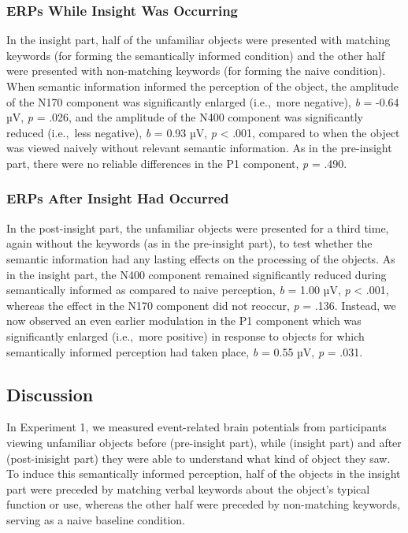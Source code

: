 \documentclass[
  english,
  man,12pt,twoside]{apa7}
\begin{document}
\hypertarget{erps-while-insight-was-occurring}{%
\subsubsection{ERPs While Insight Was Occurring}\label{erps-while-insight-was-occurring}}

In the insight part, half of the unfamiliar objects were presented with matching keywords (for forming the semantically informed condition) and the other half were presented with non-matching keywords (for forming the naive condition). When semantic information informed the perception of the object, the amplitude of the N170 component was significantly enlarged (i.e.,~more negative), \emph{b} = -0.64 µV, \emph{p} = .026, and the amplitude of the N400 component was significantly reduced (i.e.,~less negative), \emph{b} = 0.93 µV, \emph{p} \textless{} .001, compared to when the object was viewed naively without relevant semantic information. As in the pre-insight part, there were no reliable differences in the P1 component, \emph{p} = .490.

\hypertarget{erps-after-insight-had-occurred}{%
\subsubsection{ERPs After Insight Had Occurred}\label{erps-after-insight-had-occurred}}

In the post-insight part, the unfamiliar objects were presented for a third time, again without the keywords (as in the pre-insight part), to test whether the semantic information had any lasting effects on the processing of the objects. As in the insight part, the N400 component remained significantly reduced during semantically informed as compared to naive perception, \emph{b} = 1.00 µV, \emph{p} \textless{} .001, whereas the effect in the N170 component did not reoccur, \emph{p} = .136. Instead, we now observed an even earlier modulation in the P1 component which was significantly enlarged (i.e.,~more positive) in response to objects for which semantically informed perception had taken place, \emph{b} = 0.55 µV, \emph{p} = .031.

\hypertarget{discussion}{%
\subsection{Discussion}\label{discussion}}

In Experiment 1, we measured event-related brain potentials from participants viewing unfamiliar objects before (pre-insight part), while (insight part) and after (post-inisight part) they were able to understand what kind of object they saw. To induce this semantically informed perception, half of the objects in the insight part were preceded by matching verbal keywords about the object's typical function or use, whereas the other half were preceded by non-matching keywords, serving as a naive baseline condition.
\end{document}
